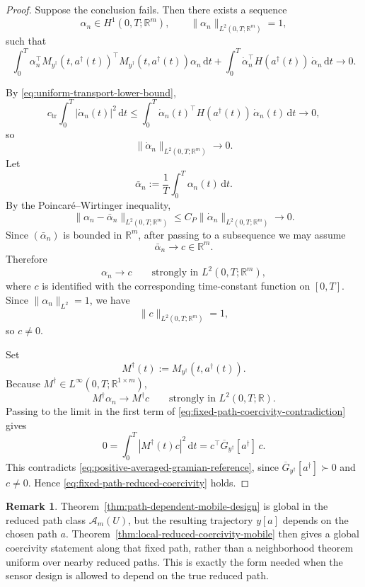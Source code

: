 \documentclass{article}
\theoremstyle{definition}
\newtheorem{remark}[theorem]{Remark}
\renewcommand{\d}{\mathrm{d}}
\begin{document}
\begin{proof}
    Suppose the conclusion fails. Then there exists a sequence
    \[
        \alpha_n\in H^1(0,T;\mathbb R^m),
        \qquad
        \|\alpha_n\|_{L^2(0,T;\mathbb R^m)}=1,
    \]
    such that
    \begin{equation}
        \label{eq:fixed-path-coercivity-contradiction}
        \int_0^T \alpha_n^\top
        M_{y^\dagger}(t,a^\dagger(t))^\top
        M_{y^\dagger}(t,a^\dagger(t))
        \alpha_n\,\d t
        +
        \int_0^T \dot\alpha_n^\top H(a^\dagger(t))\,\dot\alpha_n\,\d t
        \longrightarrow 0.
    \end{equation}

    By \eqref{eq:uniform-transport-lower-bound},
    \[
        c_{\mathrm{tr}}\int_0^T |\dot\alpha_n(t)|^2\,\d t
        \le
        \int_0^T \dot\alpha_n(t)^\top H(a^\dagger(t))\,\dot\alpha_n(t)\,\d t
        \longrightarrow 0,
    \]
    so
    \[
        \|\dot\alpha_n\|_{L^2(0,T;\mathbb R^m)}\to 0.
    \]
    Let
    \[
        \bar\alpha_n:=\frac1T\int_0^T \alpha_n(t)\,\d t.
    \]
    By the Poincar\'e--Wirtinger inequality,
    \[
        \|\alpha_n-\bar\alpha_n\|_{L^2(0,T;\mathbb R^m)}
        \le
        C_P \|\dot\alpha_n\|_{L^2(0,T;\mathbb R^m)}
        \to 0.
    \]
    Since \((\bar\alpha_n)\) is bounded in \(\mathbb R^m\), after passing to a subsequence we may
    assume
    \[
        \bar\alpha_n\to c\in\mathbb R^m.
    \]
    Therefore
    \[
        \alpha_n\to c
        \qquad\text{strongly in }L^2(0,T;\mathbb R^m),
    \]
    where \(c\) is identified with the corresponding time-constant function on \([0,T]\). Since
    \(\|\alpha_n\|_{L^2}=1\), we have
    \[
        \|c\|_{L^2(0,T;\mathbb R^m)}=1,
    \]
    so \(c\neq 0\).

    Set
    \[
        M^\dagger(t):=M_{y^\dagger}(t,a^\dagger(t)).
    \]
    Because \(M^\dagger\in L^\infty(0,T;\mathbb R^{1\times m})\),
    \[
        M^\dagger \alpha_n \to M^\dagger c
        \qquad\text{strongly in }L^2(0,T;\mathbb R).
    \]
    Passing to the limit in the first term of \eqref{eq:fixed-path-coercivity-contradiction} gives
    \[
        0
        =
        \int_0^T |M^\dagger(t)c|^2\,\d t
        =
        c^\top \overline G_{y^\dagger}[a^\dagger]\,c.
    \]
    This contradicts \eqref{eq:positive-averaged-gramian-reference}, since
    \(\overline G_{y^\dagger}[a^\dagger]\succ 0\) and \(c\neq 0\). Hence
    \eqref{eq:fixed-path-reduced-coercivity} holds.
\end{proof}

\begin{remark}
    \label{rem:fixed-path-versus-uniform-path-class}
    Theorem~\ref{thm:path-dependent-mobile-design} is global in the reduced path class
    \(\mathcal A_m(U)\), but the resulting trajectory \(y[a]\) depends on the chosen path \(a\).
    Theorem~\ref{thm:local-reduced-coercivity-mobile} then gives a global coercivity statement along
    that fixed path, rather than a neighborhood theorem uniform over nearby reduced paths.
    This is exactly the form needed when the sensor design is allowed to depend on the true reduced
    path.
\end{remark}
\end{document}
